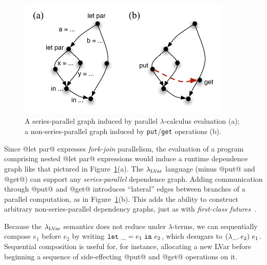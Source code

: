 \begin{figure}[tb]
  \centering 
\includegraphics[width=4in]{chapter2/figures/lvars-series-parallel.pdf} 
\caption{A series-parallel graph induced by parallel
  $\lambda$-calculus evaluation (a); a non-series-parallel graph
  induced by \lstinline|put|/\lstinline|get| operations (b).}
  \label{f:lvars-series-parallel}
\end{figure}

Since @let par@ expresses \emph{fork-join} parallelism, the evaluation
of a program comprising nested @let par@ expressions would induce a
runtime dependence graph like that pictured in
Figure~\ref{f:lvars-series-parallel}(a).  The $\lambda_{\textrm{LVar}}$ language
(minus @put@ and @get@) can support any \emph{series-parallel}
dependence graph.  Adding communication through @put@ and @get@
introduces ``lateral'' edges between branches of a parallel
computation, as in Figure~\ref{f:lvars-series-parallel}(b).  This adds
the ability to construct arbitrary non-series-parallel dependency
graphs, just as with \emph{first-class
  futures}~\cite{beyond-nested-workstealing}.

Because the $\lambda_{\textrm{LVar}}$ semantics does not reduce under
$\lambda$-terms, we can sequentially compose $e_1$ before $e_2$ by
writing $\mbox{\texttt{let}}~\_=e_1~\mbox{\texttt{in}}~e_2$, which desugars to
$(\lambda\_.\,e_2)~e_1$.  Sequential composition is useful for,
for instance, allocating a new LVar before beginning a sequence of
side-effecting @put@ and @get@ operations on it.
